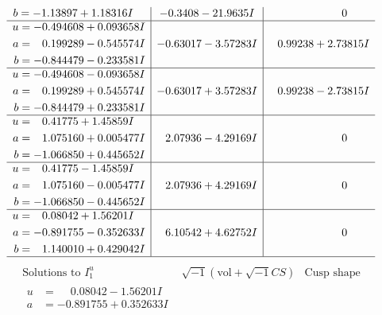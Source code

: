 \documentclass[1p]{elsarticle_modified}
\theoremstyle{definition}
\newcommand{\I}{\sqrt{-1}}
\begin{document}
$$\begin{array}{c|c|c}
\begin{aligned}
b &= -1.13897 + 1.18316 I\end{aligned}
 & -0.3408 - 21.9635 I & \phantom{-0.000000 } 0 \\ \hline\begin{aligned}
u &= -0.494608 + 0.093658 I \\
a &= \phantom{-}0.199289 - 0.545574 I \\
b &= -0.844479 - 0.233581 I\end{aligned}
 & -0.63017 - 3.57283 I & \phantom{-}0.99238 + 2.73815 I \\ \hline\begin{aligned}
u &= -0.494608 - 0.093658 I \\
a &= \phantom{-}0.199289 + 0.545574 I \\
b &= -0.844479 + 0.233581 I\end{aligned}
 & -0.63017 + 3.57283 I & \phantom{-}0.99238 - 2.73815 I \\ \hline\begin{aligned}
u &= \phantom{-}0.41775 + 1.45859 I \\
a &= \phantom{-}1.075160 + 0.005477 I \\
b &= -1.066850 + 0.445652 I\end{aligned}
 & \phantom{-}2.07936 - 4.29169 I & \phantom{-0.000000 } 0 \\ \hline\begin{aligned}
u &= \phantom{-}0.41775 - 1.45859 I \\
a &= \phantom{-}1.075160 - 0.005477 I \\
b &= -1.066850 - 0.445652 I\end{aligned}
 & \phantom{-}2.07936 + 4.29169 I & \phantom{-0.000000 } 0 \\ \hline\begin{aligned}
u &= \phantom{-}0.08042 + 1.56201 I \\
a &= -0.891755 - 0.352633 I \\
b &= \phantom{-}1.140010 + 0.429042 I\end{aligned}
 & \phantom{-}6.10542 + 4.62752 I & \phantom{-0.000000 } 0\\
 \hline 
 \end{array}$$\newpage$$\begin{array}{c|c|c}  
\text{Solutions to }I^u_{1}& \I (\text{vol} + \sqrt{-1}CS) & \text{Cusp shape}\\
 \hline 
\begin{aligned}
u &= \phantom{-}0.08042 - 1.56201 I \\
a &= -0.891755 + 0.352633 I \\

\end{aligned}
\end{array}$$
\end{document}
